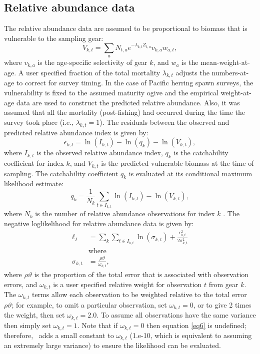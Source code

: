 \subsection{Relative abundance data}
The relative abundance data are assumed to be proportional to biomass that is vulnerable to the sampling gear:
\begin{equation}\label{eq4}
 V_{k,t} = \sum_a N_{t,a} e^{-\lambda_{k,t} Z_{t,a}} v_{k,a} w_{a,t},
\end{equation}
where $v_{k,a}$ is the age-specific selectivity of gear $k$, and $w_a$ is the mean-weight-at-age. A user specified fraction of the total mortality $\lambda_{k,t}$ adjusts the numbers-at-age to correct for survey timing.  In the case of Pacific herring spawn surveys, the vulnerability is fixed to the assumed maturity ogive and the empirical weight-at-age data are used to construct the predicted relative abundance.  Also, it was assumed that all the mortality (post-fishing) had occurred during the time the survey took place (i.e., $\lambda_{k,t}=1$).  The residuals between the observed and predicted relative abundance index is given by:
\begin{equation}\label{eq5}
\epsilon_{k,t} = \ln(I_{k,t}) - \ln(q_k) - \ln(V_{k,t}),
\end{equation}
where $I_{k,t}$ is the observed relative abundance index, $q_k$ is the catchability coefficient for index $k$, and $V_{k,t}$ is the predicted vulnerable biomass at the time of sampling.  The catchability coefficient $q_k$ is evaluated at its conditional maximum likelihood estimate:
\[
  q_k =\frac{1}{N_k} \sum_{t \in I_{k,t}} \ln(I_{k,t}) - \ln(V_{k,t}),
\]
where $N_k$ is the number of relative abundance observations for index $k$ \citep[see][for more information]{walters1994calculation}. The negative loglikelihood for relative abundance data is given by:
\begin{align}
\ell_I &= \sum_k \sum_{t \in I_{k,t}}  \ln(\sigma_{k,t})+\frac{\epsilon_{k,t}^2}{2\sigma_{k,t}^2} \label{eq6}\\
&\mbox{where}\nonumber\\
\sigma_{k,t} &= \frac{\rho \vartheta}{ \omega_{k,t}},  \nonumber
\end{align}
where $\rho \vartheta$ is the proportion of the total error that is associated with observation errors, and $\omega_{k,t}$ is a user specified relative weight for observation $t$ from gear $k$.  The $ \omega_{k,t}$ terms allow each observation to be weighted relative to the total error $\rho \vartheta$; for example, to omit a particular observation, set $\omega_{k,t}=0$, or to give 2 times the weight, then set  $\omega_{k,t}=2.0$. To assume all observations have the same variance then simply set  $\omega_{k,t}=1$.  Note that if  $\omega_{k,t}=0$ then equation \eqref{eq6} is undefined; therefore, \iscam\ adds a small constant to  $\omega_{k,t}$ (1.e-10, which is equivalent to assuming an extremely large variance)  to ensure the likelihood can be evaluated.

